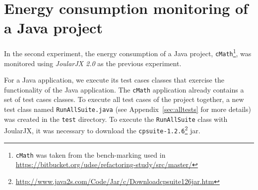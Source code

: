 \vspace{-10pt}
\section{Energy consumption monitoring of a Java project} 



In the second experiment, the energy consumption of a Java project, \ie \texttt{cMath}\footnote{\texttt{cMath} was taken from the bench-marking used in~\cite{DBLP:conf/esem/SahinPC14} \url{https://bitbucket.org/udse/refactoring-study/src/master/} }, was monitored using \textit{JoularJX 2.0} as the previous experiment. 

\vspace{.5em}
For a Java application, we execute its test cases classes that exercise the functionality of the Java application. The \texttt{cMath} application already contains a set of test cases classes. To execute all test cases of the project together, a new test class named \texttt{RunAllSuite.java} (see Appendix~\ref{sec:alltests} for more details) was created in the \texttt{test} directory. To execute the \texttt{RunAllSuite} class with JoularJX, it was necessary to download the \texttt{cpsuite-1.2.6}\footnote{\url{http://www.java2s.com/Code/Jar/c/Downloadcpsuite126jar.htm}} jar. 

